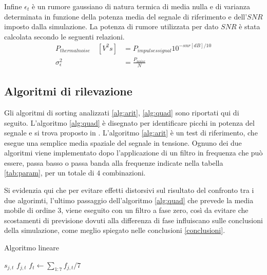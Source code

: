 %
Infine $\epsilon_{t}$ è un rumore gaussiano di natura termica di media nulla e di varianza determinata in funzione della potenza media del segnale di riferimento e dell'$SNR$ imposto dalla simulazione. La potenza di rumore utilizzata per dato $SNR$ è stata calcolata secondo le seguenti relazioni.
\begin{align*}
P_{thermal noise} \quad [V^2s] &=  P_{impulses signal} 10^{- snr [dB]/10} \\
\sigma^{2}_{\epsilon} &= \frac{ P_{noise} }{ N }
\end{align*}




\subsection{Algoritmi di rilevazione}

Gli algoritmi di sorting analizzati \ref{alg:arit}, \ref{alg:quad} sono riportati qui di seguito. L'algoritmo \ref{alg:quad} è disegnato per identificare picchi in potenza del segnale e si trova proposto in \cite{Lambacher2011}. L'algoritmo \ref{alg:arit} è un test di riferimento, che esegue una semplice media spaziale del segnale in tensione.
Ognuno dei due algoritmi viene implementato dopo l'applicazione di un filtro in frequenza che può essere, passa basso o passa banda alla frequenze indicate nella tabella \ref{tab:param}, per un totale di $4$ combinazioni.

Si evidenzia qui che per evitare effetti distorsivi sul risultato del confronto tra i due algorimti, l'ultimo passaggio dell'algoritmo \ref{alg:quad} che prevede la media mobile di ordine 3, viene eseguito con un filtro a fase zero, così da evitare che scostamenti di previsione dovuti alla differenza di fase influiscano sulle conclusioni della simulazione, come meglio spiegato nelle conclusioni \ref{conclusioni}.


\begin{algorithm}
\caption{Algoritmo lineare}\label{alg:arit}
\begin{algorithmic}[1]
\State $s_{j,t}$ 
\State $f_{j,t}$ 
\State $f_{t}\gets \sum_{1:7}   f_{j,t}/7$ 
\end{algorithmic}
\end{algorithm}


